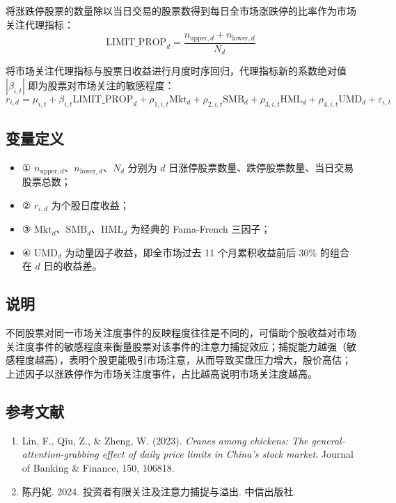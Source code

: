 \documentclass{article}
\begin{document}
将涨跌停股票的数量除以当日交易的股票数得到每日全市场涨跌停的比率作为市场关注代理指标：
\begin{equation}
    \mathrm{LIMIT\_PROP}_d = \frac{n_{\mathrm{upper},d} + n_{\mathrm{lower},d}}{N_d}
\end{equation}

将市场关注代理指标与股票日收益进行月度时序回归，代理指标新的系数绝对值 \(|\beta_{i,t}|\) 即为股票对市场关注的敏感程度：
\begin{equation}
    r_{i,d} = \mu_{i,t} + \beta_{i,t} \mathrm{LIMIT\_PROP}_d + \rho_{1,i,t} \mathrm{Mkt}_d + \rho_{2,i,t} \mathrm{SMB}_d + \rho_{3,i,t} \mathrm{HML}_d + \rho_{4,i,t} \mathrm{UMD}_d + \varepsilon_{i,t}
\end{equation}

\subsection{变量定义}
\begin{itemize}
    \item ① \(n_{\mathrm{upper},d}\)、\(n_{\mathrm{lower},d}\)、\(N_d\) 分别为 \(d\) 日涨停股票数量、跌停股票数量、当日交易股票总数；
    \item ② \(r_{i,d}\) 为个股日度收益；
    \item ③ \(\mathrm{Mkt}_d\)、\(\mathrm{SMB}_d\)、\(\mathrm{HML}_d\) 为经典的 Fama-French 三因子；
    \item ④ \(\mathrm{UMD}_d\) 为动量因子收益，即全市场过去 11 个月累积收益前后 30\% 的组合在 \(d\) 日的收益差。
\end{itemize}

\subsection{说明}
不同股票对同一市场关注度事件的反映程度往往是不同的，可借助个股收益对市场关注度事件的敏感程度来衡量股票对该事件的注意力捕捉效应；捕捉能力越强（敏感程度越高），表明个股更能吸引市场注意，从而导致买盘压力增大，股价高估；上述因子以涨跌停作为市场关注度事件，占比越高说明市场关注度越高。

\subsection{参考文献}
\begin{enumerate}
    \item Lin, F., Qiu, Z., \& Zheng, W. (2023). \textit{Cranes among chickens: The general-attention-grabbing effect of daily price limits in China's stock market}. Journal of Banking \& Finance, 150, 106818.
    \item 陈丹妮. 2024. 投资者有限关注及注意力捕捉与溢出. 中信出版社.
\end{enumerate}
\end{document}
